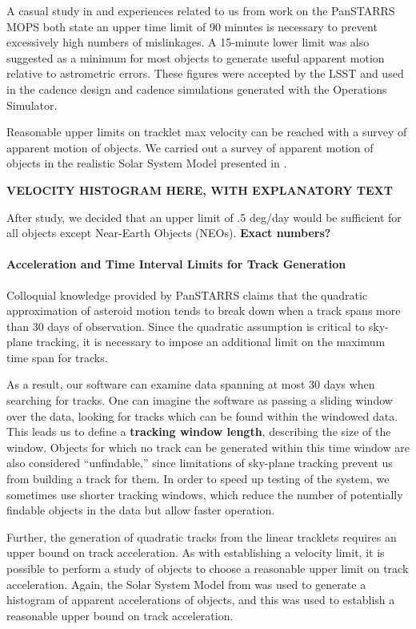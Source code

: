 \documentclass[12pt,preprint]{aastex}
\begin{document}
A casual study in \citet{kubica_thesis} and experiences related to us
from work on the PanSTARRS MOPS both state an upper time limit of 90
minutes is necessary to prevent excessively high numbers of
mislinkages. A 15-minute lower limit was also suggested as a minimum
for most objects to generate useful apparent motion relative to
astrometric errors. These figures were accepted by the LSST and used
in the cadence design and cadence simulations generated with the
Operations Simulator.  

Reasonable upper limits on tracklet max velocity can be reached with a
survey of apparent motion of objects.  We carried out a survey of
apparent motion of objects in the realistic Solar System Model
presented in \citet{Grav2011}.

\textbf{VELOCITY HISTOGRAM HERE, WITH EXPLANATORY TEXT}

After study, we decided that an upper limit of .5 deg/day would be
sufficient for all objects except Near-Earth Objects
(NEOs). \textbf{Exact numbers?}




\paragraph{Acceleration and Time Interval Limits for Track Generation}

Colloquial knowledge provided by PanSTARRS claims that the quadratic
approximation of asteroid motion tends to break down when a track
spans more than 30 days of observation.  Since the quadratic
assumption is critical to sky-plane tracking, it is necessary to
impose an additional limit on the maximum time span for tracks. 

As a result, our software can examine data spanning at most 30 days
when searching for tracks.  One can imagine the software as passing a
sliding window over the data, looking for tracks which can be found
within the windowed data.  This leads us to define a \textbf{tracking
  window length}, describing the size of the window.  Objects for
which no track can be generated within this time window are also
considered ``unfindable,'' since limitations of sky-plane tracking
prevent us from building a track for them.  In order to speed up
testing of the system, we sometimes use shorter tracking windows,
which reduce the number of potentially findable objects in the data
but allow faster operation.

Further, the generation of quadratic tracks from the linear tracklets
requires an upper bound on track acceleration.  As with establishing a
velocity limit, it is possible to perform a study of objects to choose
a reasonable upper limit on track acceleration.  Again, the Solar
System Model from \citet{Grav2011} was used to generate a histogram of
apparent accelerations of objects, and this was used to establish a
reasonable upper bound on track acceleration.
\end{document}
